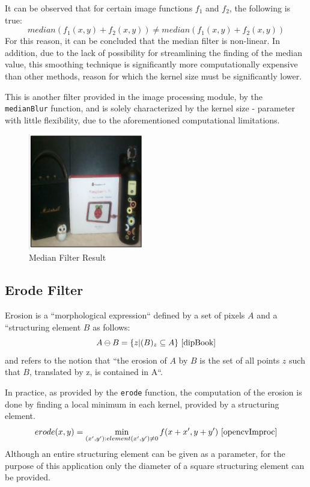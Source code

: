 It can be observed that for certain image functions \(f_1\) and \(f_2\), the following is true:
\[median(f_1(x, y) + f_2(x, y)) \neq median(f_1(x, y) + f_2(x, y))\]
For this reason, it can be concluded that the median filter is non-linear. In addition, due to the lack of
possibility for streamlining the finding of the median value, this smoothing technique is significantly more
computationally expensive than other methods, reason for which the kernel size must be significantly lower.

This is another filter provided in the image processing module, by the \verb|medianBlur| function, and is
solely characterized by the kernel size - parameter with little flexibility, due to the aforementioned
computational limitations.

\begin{figure}[H]
	\includegraphics[width=0.45\textwidth, height=0.45\textwidth]{resources/Median_2.png}
	\caption{Median Filter Result}
\end{figure}

\subsection{Erode Filter}

Erosion is a ``morphological expression`` defined by a set of pixels \(A\) and a ``structuring element \(B\)
as follows: \[A \ominus B = \{z | (B)_z \subseteq A\}\text{ \cite{dipBook}}\] and refers to the notion that
``the erosion of \(A\) by \(B\) is the set of all points \(z\) such that \(B\), translated by z, is contained
in A``. \cite{dipBook}

In practice, as provided by the \verb|erode| function, the computation of the erosion is done by finding a
local minimum in each kernel, provided by a structuring element.
\[erode(x, y) = \min\limits_{(x', y'): element(x', y') \neq 0} f(x + x', y + y')\text{ \cite{opencvImproc}}\]
Although an entire structuring element can be given as a parameter, for the purpose of this application only
the diameter of a square structuring element can be provided.

